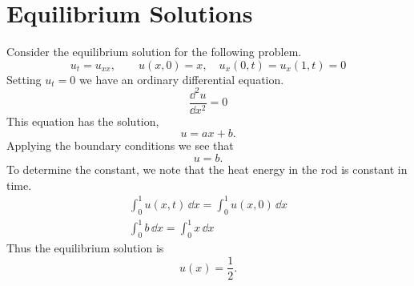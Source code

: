\section{Equilibrium Solutions}


\begin{Example}
  Consider the equilibrium solution for the following problem.
  \[ 
  u_t = u_{x x}, \qquad u(x,0) = x, \quad u_x(0,t) = u_x(1,t) = 0
  \]
  Setting $u_t = 0$ we have an ordinary differential equation.
  \[ 
  \frac{\dd^2 u}{\dd x^2} = 0
  \]
  This equation has the solution,
  \[
  u = a x + b. 
  \]
  Applying the boundary conditions we see that
  \[ 
  u = b. 
  \]
  To determine the constant, we note that the heat energy in the rod is
  constant in time.
  \begin{gather*}
    \int_0^1 u(x,t)\,\dd x = \int_0^1 u(x,0) \,\dd x 
    \\
    \int_0^1 b \,\dd x = \int_0^1 x \,\dd x
  \end{gather*}
  Thus the equilibrium solution is
  \[ 
  u(x) = \frac{1}{2}. 
  \]
\end{Example}





















